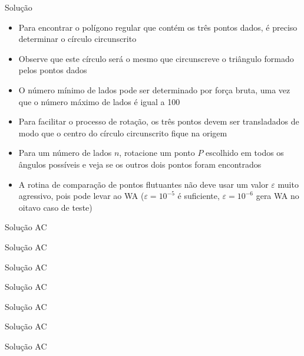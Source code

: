 \begin{frame}[fragile]{Solução}

    \begin{itemize}
        \item Para encontrar o polígono regular que contém os três pontos dados, é preciso
            determinar o círculo circunscrito
        \pause

        \item Observe que este círculo será o mesmo que circunscreve o triângulo formado pelos
            pontos dados
        \pause

        \item O número mínimo de lados pode ser determinado por força bruta, uma vez que o
            número máximo de lados é igual a 100
        \pause

        \item Para facilitar o processo de rotação, os três pontos devem ser transladados de
            modo que o centro do círculo circunscrito fique na origem
        \pause

        \item Para um número de lados $n$, rotacione um ponto $P$ escolhido em todos os ângulos
            possíveis e veja se os outros dois pontos foram encontrados
        \pause

        \item A rotina de comparação de pontos flutuantes não deve usar um valor $\varepsilon$ muito
            agressivo, pois pode levar ao WA ($\varepsilon = 10^{-5}$ é suficiente, 
            $\varepsilon = 10^{-6}$ gera WA no oitavo caso de teste)

    \end{itemize}

\end{frame}

\begin{frame}[fragile]{Solução AC}
\end{frame}

\begin{frame}[fragile]{Solução AC}
\end{frame}

\begin{frame}[fragile]{Solução AC}
\end{frame}

\begin{frame}[fragile]{Solução AC}
\end{frame}

\begin{frame}[fragile]{Solução AC}
\end{frame}

\begin{frame}[fragile]{Solução AC}
\end{frame}

\begin{frame}[fragile]{Solução AC}
\end{frame}
